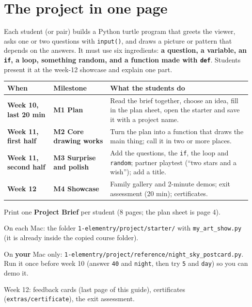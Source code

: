 \documentclass[level=1,teacher]{kidscode}
\begin{document}
\tableofcontents

\section{The project in one page}
Each student (or pair) builds a Python turtle program that greets the viewer, asks one or two
questions with \texttt{input()}, and draws a picture or pattern that depends on the answers.
It must use six ingredients: \textbf{a question, a variable, an \texttt{if}, a loop, something random,
and a function made with \texttt{def}}. Students present it at the week-12 showcase and explain one part.

\renewcommand{\arraystretch}{1.35}
\begin{tabularx}{\linewidth}{@{}>{\bfseries}p{2.4cm}>{\bfseries}p{3.4cm}X@{}}
\toprule
When & Milestone & What the students do\\
\midrule
Week 10, last 20 min & M1 Plan & Read the brief together, choose an idea, fill in the plan sheet, open the starter and save it with a project name.\\
Week 11, first half & M2 Core drawing works & Turn the plan into a function that draws the main thing; call it in two or more places.\\
Week 11, second half & M3 Surprise and polish & Add the questions, the \texttt{if}, the loop and \texttt{random}; partner playtest (\enquote{two stars and a wish}); add a title.\\
Week 12 & M4 Showcase & Family gallery and 2-minute demos; exit assessment (20 min); certificates.\\
\bottomrule
\end{tabularx}

\begin{materials}
  \item Print one \textbf{Project Brief} per student (8 pages; the plan sheet is page 4).
  \item On each Mac: the folder \texttt{1-elementry/\allowbreak{}project/\allowbreak{}starter/\allowbreak{}} with \texttt{my\_art\_show.py}
        (it is already inside the copied course folder).
  \item On \textbf{your} Mac only: \texttt{1-elementry/\allowbreak{}project/\allowbreak{}reference/\allowbreak{}night\_sky\_postcard.py}.
        Run it once before week 10 (answer \texttt{40} and \texttt{night}, then try \texttt{5} and \texttt{day}) so you can demo it.
  \item Week 12: feedback cards (last page of this guide), certificates (\texttt{extras/\allowbreak{}certificate}), the exit assessment.
\end{materials}
\end{document}
